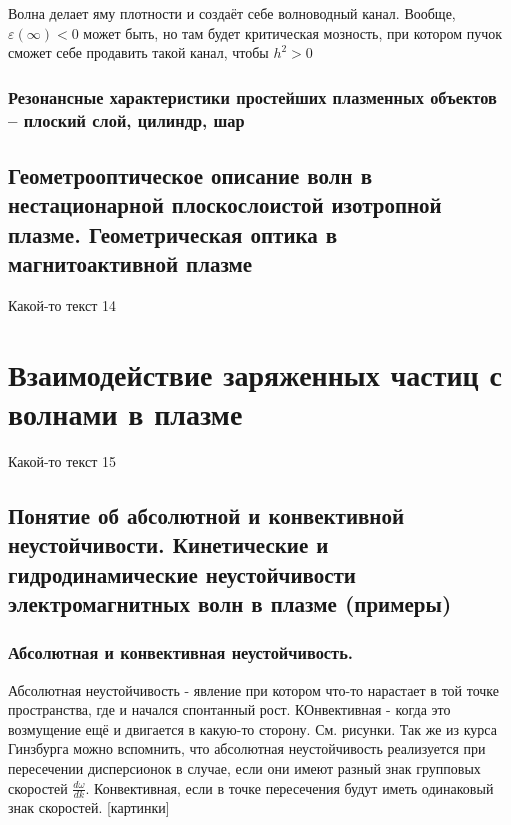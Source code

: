 \documentclass[10pt, a4paper]{article}
\let\stdsection\section
\renewcommand\section{\newpage\stdsection}
\begin{document}
Волна делает яму плотности и создаёт себе волноводный канал. Вообще, $\varepsilon(\infty)<0$ может быть, но там будет критическая мозность, при котором пучок сможет себе продавить такой канал, чтобы $h^2>0$

\subsubsection{Резонансные характеристики простейших плазменных объектов – плоский слой, цилиндр, шар}

\subsection{Геометрооптическое описание волн в нестационарной плоскослоистой изотропной плазме. Геометрическая оптика в магнитоактивной плазме}

Какой-то текст 14

\section{Взаимодействие заряженных частиц с волнами в плазме}

Какой-то текст 15

\subsection{Понятие об абсолютной и конвективной неустойчивости. Кинетические и гидродинамические неустойчивости электромагнитных волн в плазме (примеры)}

\subsubsection{Абсолютная и конвективная неустойчивость.}
Абсолютная неустойчивость - явление при котором что-то нарастает в той точке пространства, где и начался спонтанный рост. КОнвективная - когда это возмущение ещё и двигается в какую-то сторону. См. рисунки. Так же из курса Гинзбурга можно вспомнить, что абсолютная неустойчивость реализуется при пересечении дисперсионок в случае, если они имеют разный знак групповых скоростей $\frac {d\omega}{dk}$. Конвективная, если в точке пересечения будут иметь одинаковый знак скоростей.
[картинки]
\end{document}
